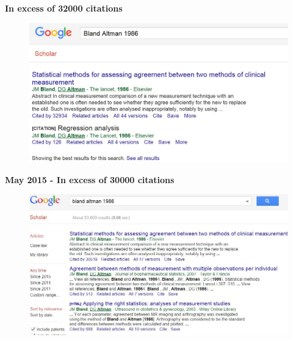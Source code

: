 \documentclass[compress]{beamer}        %
\begin{document}
		
		
		
		\begin{frame}
			\textbf{In excess of 32000 citations}
			\begin{figure}
				\centering
				\includegraphics[width=0.9\linewidth]{images/BACITE-dec2015}
				
				\label{fig:BACITE}
			\end{figure}
			
		\end{frame}
				\begin{frame}
					\textbf{May 2015 - In excess of 30000 citations}
					\begin{figure}
						\centering
						\includegraphics[width=0.9\linewidth]{images/BACITE}
						
						\label{fig:BACITE}
					\end{figure}
					
				\end{frame}
\end{document}
